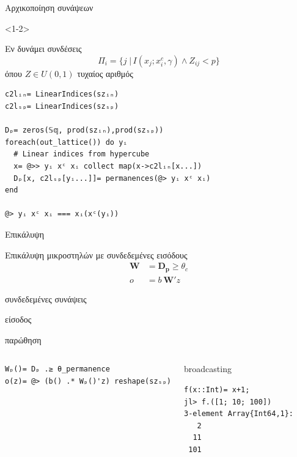 \documentclass[10pt,lualatex]{beamer}
\begin{document}
\begin{frame}[fragile]{Αρχικοποίηση συνάψεων}
\begin{onlyenv}<1-2>
\begin{block}{Εν δυνάμει συνδέσεις}
  \[ Π_i= \{j \;|\, I(x_j; x_i^c, γ) \wedge Z_{ij} < p\} \]
  όπου $Ζ \in U(0,1)$ τυχαίος αριθμός
\end{block}
\pause
\begin{verbatim}
c2lᵢₙ= LinearIndices(szᵢₙ)
c2lₛₚ= LinearIndices(szₛₚ)

Dₚ= zeros(𝕊𝕢, prod(szᵢₙ),prod(szₛₚ))
foreach(out_lattice()) do yᵢ
  # Linear indices from hypercube
  x= @>> yᵢ xᶜ xᵢ collect map(x->c2lᵢₙ[x...])
  Dₚ[x, c2lₛₚ[yᵢ...]]= permanences(@> yᵢ xᶜ xᵢ)
end

@> yᵢ xᶜ xᵢ === xᵢ(xᶜ(yᵢ))
\end{verbatim}
\end{onlyenv}

\end{frame}

\begin{frame}[fragile]{Επικάλυψη}
\begin{block}{Επικάλυψη μικροστηλών με συνδεδεμένες εισόδους}
  \begin{align*}
    \mathbf{W} &= \mathbf{D_p} \ge θ_c\\
    o &= b\:\mathbf{W}'z
  \end{align*}
  \vspace{-2.2\topsep}
  \begin{description}[ddddd]
		\small
	  \item[$\mathbf{W}$] [$ℓ_{in} × ℓ_{sp}$] συνδεδεμένες συνάψεις
	  \item[$z$] [$ℓ_{in}$] είσοδος
	  \item[$b$] [$ℓ_{sp}$] παρώθηση
  \end{description}
\end{block}
\pause
\begin{columns}[T]
\begin{verbatim}
Wₚ()= Dₚ .≥ θ_permanence
o(z)= @> (b() .* Wₚ()'z) reshape(szₛₚ)
\end{verbatim}
\pause
{}
\begin{block}{broadcasting}
\begin{verbatim}
f(x::Int)= x+1;
jl> f.([1; 10; 100])
3-element Array{Int64,1}:
   2
  11
 101
\end{verbatim}
\end{block}
\end{columns}
\end{frame}
\end{document}
